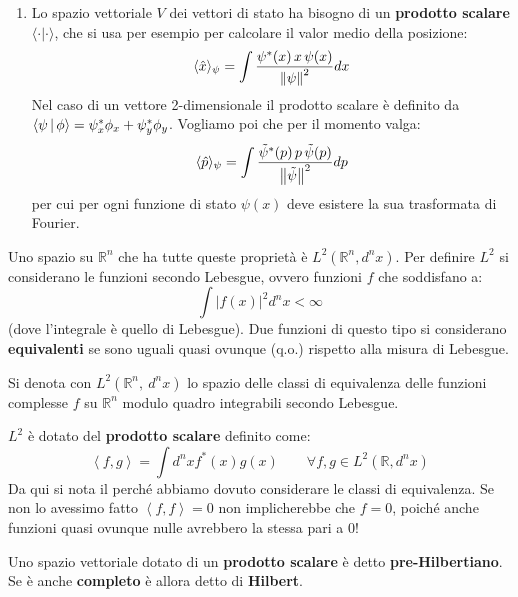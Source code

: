 \documentclass[FisicaTeorica.tex]{subfiles}
\begin{document}
\begin{enumerate}
\begin{dfn}
    \end{dfn}
    \item Lo spazio vettoriale $V$ dei vettori di stato ha bisogno di un \textbf{prodotto scalare} $\langle \cdot | \cdot \rangle$, che si usa per esempio per calcolare il valor medio della posizione:
    \[
    \langle \hat{x}\rangle_\psi = \int \frac{\psi^*(x) \, x \, \psi(x)}{\left\lVert\psi\right\rVert^2} dx
    \]
    Nel caso di un vettore 2-dimensionale il prodotto scalare è definito da $\Braket{\psi|\phi} = \psi_x^* \phi_x + \psi_y^* \phi_y$.
    Vogliamo poi che per il momento valga:
    \[
    \langle \hat{p} \rangle_\psi = \int \frac{\tilde\psi^*(p) \, p \, \tilde\psi(p)}{\left\lVert\tilde{\psi}\right\rVert^2} dp
    \]
    per cui per ogni funzione di stato  $\psi(x)$ deve esistere la sua trasformata di Fourier.
\end{enumerate}
Uno spazio su $\mathbb{R}^n$ che ha tutte queste proprietà è $L^2\left(\mathbb{R}^n,d^nx\right)$. Per definire $L^2$ si  considerano le funzioni  secondo Lebesgue, ovvero funzioni $f$ che soddisfano a:
\[
	\int \left|f\left(x\right)\right|^2d^nx<\infty
\]
(dove l'integrale è quello di Lebesgue). Due funzioni di questo tipo si considerano \textbf{equivalenti} se sono uguali quasi ovunque (q.o.) rispetto alla misura di Lebesgue.
\begin{dfn}
Si denota con $L^2\left(\mathbb{R}^n,\ d^n x\right)$ lo spazio delle classi di equivalenza delle funzioni complesse $f$ su $\mathbb{R}^n$ modulo quadro integrabili secondo Lebesgue.
\end{dfn}
$L^2$ è dotato del \textbf{prodotto scalare} definito come:
\[
	\left\langle f,g\right\rangle=\int d^n x f^*\left(x\right)g\left(x\right) \qquad \forall f,g \in L^2\left(\mathbb{R},d^n x\right)
\]
Da qui si nota il perché abbiamo dovuto considerare le classi di equivalenza. Se non lo avessimo fatto $\left\langle f,f\right\rangle=0$ non implicherebbe che $f=0$, poiché anche funzioni quasi ovunque nulle avrebbero la stessa  pari a $0$!
\begin{dfn}
Uno spazio vettoriale dotato di un \textbf{prodotto scalare} è detto \textbf{pre-Hilbertiano}. Se è anche \textbf{completo} è allora detto di \textbf{Hilbert}.
\end{dfn}
\end{document}

